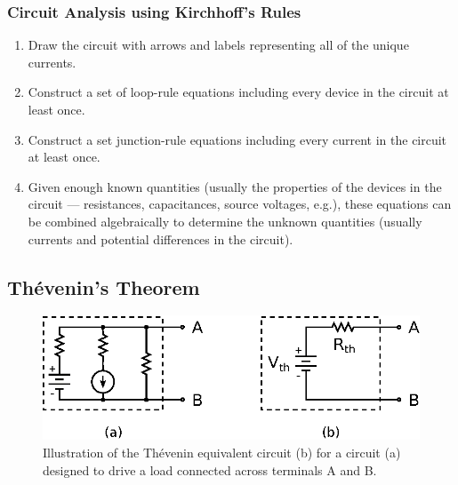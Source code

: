 \documentclass[11pt]{article}
\begin{document}
\subsubsection*{Circuit Analysis using Kirchhoff's Rules}
\begin{enumerate}
\item Draw the circuit with arrows and labels representing all of
  the unique currents.
 
\item Construct a set of loop-rule equations including every
  device in the circuit at least once.

\item Construct a set junction-rule equations including every
  current in the circuit at least once.

\item Given enough known quantities (usually the properties of the
  devices in the circuit --- resistances, capacitances, source
  voltages, e.g.), these equations can be combined algebraically
  to determine the unknown quantities (usually currents and
  potential differences in the circuit).
\end{enumerate}
\begin{latexonly}
  \noindent
  \hrulefill
\end{latexonly}
\htmlrule


\subsection{Th\'{e}venin's Theorem}
\label{sec:thevenin}
           
\begin{figure}[ht]
  \begin{center}
    \includegraphics{thevenin.eps}
    \caption{Illustration of the Th\'{e}venin equivalent circuit (b) for a
      circuit (a) designed to drive a load connected across terminals A
      and B.}
    \label{fig:thevenin}
  \end{center}
\end{figure}
\end{document}
